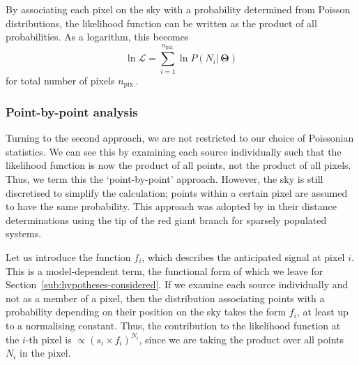 \documentclass[fleqn,usenatbib]{mnras}
\begin{document}
                By associating each pixel on the sky with a probability determined from Poisson distributions, the likelihood function can be written as the product of all probabilities.
                As a logarithm, this becomes
                \begin{equation}
                    \ln \mathcal{L} = \sum_{i=1}^{n_{\text{pix.}}} \ln P(N_i | \, \mathbf{\Theta} ) \label{eq:poisson-likelihood}
                \end{equation}
                for total number of pixels $n_{\text{pix.}}$.
                
            \subsubsection{Point-by-point analysis}
                Turning to the second approach, we are not restricted to our choice of Poissonian statistics.
                We can see this by examining each source individually such that the likelihood function is now the product of all points, not the product of all pixels. 
                Thus, we term this the `point-by-point' approach.
                However, the sky is still discretised to simplify the calculation; points within a certain pixel are assumed to have the same probability.
                This approach was adopted by \citet{conn2011,conn2012} in their distance determinations using the tip of the red giant branch for sparsely populated systems.

                Let us introduce the function $f_i$, which describes the anticipated signal at pixel $i$.
                This is a model-dependent term, the functional form of which we leave for Section~\ref{sub:hypotheses-considered}.
                If we examine each source individually and not as a member of a pixel, then the distribution associating points with a probability depending on their position on the sky takes the form $f_i$, at least up to a normalising constant.
                Thus, the contribution to the likelihood function at the $i$-th pixel is $\propto (s_i \times f_i)^{N_i}$, since we are taking the product over all points $N_i$ in the pixel.
\end{document}
